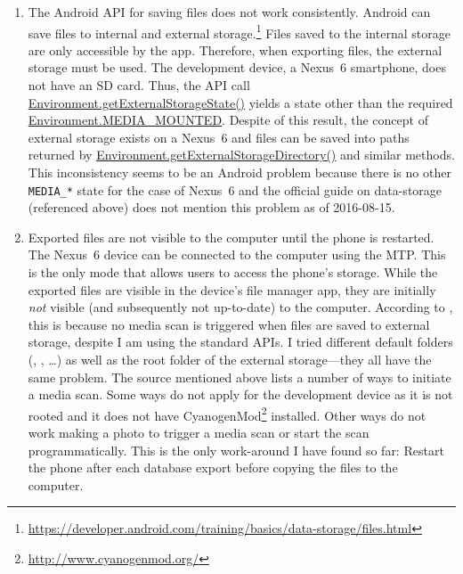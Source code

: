 \begin{enumerate}

  \item The Android \acs{API} for saving files does not work consistently.
    Android can save files to internal and external
    storage.\footnote{\url{https://developer.android.com/training/basics/data-storage/files.html}}
    Files saved to the internal storage are only accessible by the app.
    Therefore, when exporting files, the external storage must be used.
    The development device, a Nexus~6 smartphone, does not have an SD card.
    Thus, the \acs{API} call
    \href{https://developer.android.com/reference/android/os/Environment.html#getExternalStorageState()}{Environment.getExternalStorageState()}
    yields a state other than the required
    \href{https://developer.android.com/reference/android/os/Environment.html#MEDIA_MOUNTED}{Environment.MEDIA\_MOUNTED}.
    Despite of this result, the concept of external storage exists on a Nexus~6
    and files can be saved into paths returned by
    \href{https://developer.android.com/reference/android/os/Environment.html#getExternalStorageDirectory()}{Environment.getExternalStorageDirectory()}
    and similar methods.
    This inconsistency seems to be an Android problem because there is no other
    \verb|MEDIA_*| state for the case of Nexus~6 and the official guide on
    data-storage (referenced above) does not mention this problem as of
    2016-08-15.

  \item Exported files are not visible to the computer until the phone is
    restarted.
    The Nexus~6 device can be connected to the computer using the \acf{MTP}.
    This is the only mode that allows users to access the phone's storage.
    While the exported files are visible in the device's file manager app, they
    are initially \emph{not} visible (and subsequently not up-to-date) to the
    computer.
    According to \citep{Manua66:online}, this is because no media scan is
    triggered when files are saved to external storage, despite I am using the
    standard \acsp{API}.
    I tried different default folders (, ,
    \ldots) as well as the root folder of the external storage---they all have
    the same problem.
    The source mentioned above lists a number of ways to initiate a media scan.
    Some ways do not apply for the development device as it is not rooted and it
    does not have CyanogenMod\footnote{\url{http://www.cyanogenmod.org/}}
    installed.
    Other ways do not work \eg making a photo to trigger a media scan or start
    the scan programmatically.
    This is the only work-around I have found so far: Restart the phone after
    each database export before copying the files to the computer.

\end{enumerate}

